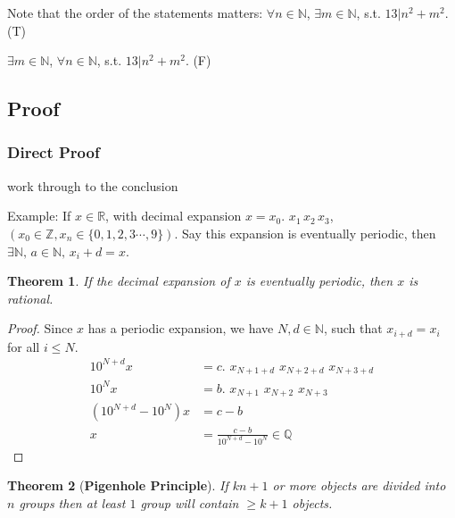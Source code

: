 \documentclass[12pt]{article}
\theoremstyle{plain}
\newtheorem{theorem}{Theorem}[subsection]
\begin{document}
	    Note that the order of the statements matters: 
	    $\forall n \in \mathbb{N}$, 
	    $\exists m \in \mathbb{N}$, s.t. $13|n^2+m^2$. (T)
	
	    $\exists m \in \mathbb{N}$, 
	    $\forall n \in \mathbb{N}$, s.t. $13|n^2+m^2$. (F)
	
	


    \vspace{0.2 in}
    \subsection{Proof}
    \subsubsection{Direct Proof}
			work through to the conclusion
        
        Example: If $x \in \mathbb{R}$, with decimal expansion 
        $x = x_0.\, \,x_1 \, x_2 \, x_3$, $(x_0 \in \mathbb{Z}, 
        x_n \in \{0, 1, 2, 3 \cdots, 9\})$. Say this expansion is eventually 
        periodic, then $\exists \mathbb{N},\, a \in \mathbb{N},\, x_i+d = x$.
        


        \begin{theorem}
            If the decimal expansion of $x$ is eventually periodic, 
            then $x $ is rational.
        \end{theorem}
        \begin{proof}
            Since $x$ has a periodic expansion, we have $N, d \in \mathbb{N}$,
            such that $x_{i+d} = x_i$ for all $i \leq N$. 
            \begin{align*}
                10^{N+d} x &= c. \,\, x_{N+1+d} \,\, x_{N+2+d} \,\, x_{N+3+d}\\
                10^N x     &= b. \,\, x_{N+1}   \,\, x_{N+2}   \,\, x_{N+3} \\
                (10^{N+d} - 10^N)x &= c-b \\
                x &= \frac{c-b}{10^{N+d}-10^N} \in \mathbb{Q}
            \end{align*}
        \end{proof}   
        
        
        \begin{theorem} [\textbf{Pigenhole Principle}]
            If $kn+1$ or more objects are divided into $n$ groups
            then at least $1$ group will contain $\geq k+1$ objects. 
        \end{theorem}
        
\end{document}
